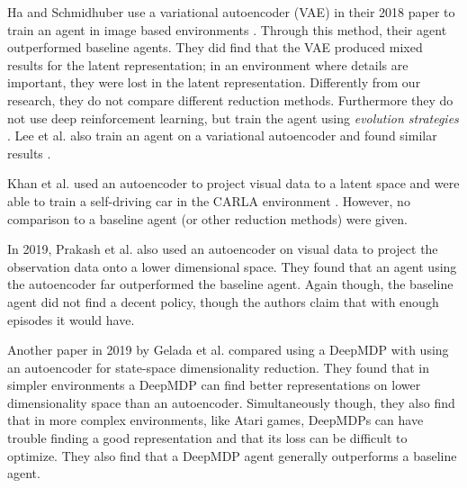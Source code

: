 Ha and Schmidhuber use a variational autoencoder (VAE) \cite{vae} in their 2018 paper to train an agent in image based environments \cite{rl_vae}. Through this method, their agent outperformed baseline agents. They did find that the VAE produced mixed results for the latent representation; in an environment where details are important, they were lost in the latent representation. Differently from our research, they do not compare different reduction methods. Furthermore they do not use deep reinforcement learning, but train the agent using \textit{evolution strategies} \cite{es}. Lee et al. also train an agent on a variational autoencoder and found similar results \cite{rl_vaetwo}.

Khan et al. used an autoencoder to project visual data to a latent space and were able to train a self-driving car in the CARLA environment \cite{rl_carla}\cite{carla}. However, no comparison to a baseline agent (or other reduction methods) were given.

In 2019, Prakash et al. \cite{AE_2019} also used an autoencoder on visual data to project the observation data onto a lower dimensional space. They found that an agent using the autoencoder far outperformed the baseline agent. Again though, the baseline agent did not find a decent policy, though the authors claim that with enough episodes it would have.

Another paper in 2019 by Gelada et al. \cite{deepmdp} compared using a DeepMDP with using an autoencoder for state-space dimensionality reduction. They found that in simpler environments a DeepMDP can find better representations on lower dimensionality space than an autoencoder. Simultaneously though, they also find that in more complex environments, like Atari games, DeepMDPs can have trouble finding a good representation and that its loss can be difficult to optimize. They also find that a DeepMDP agent generally outperforms a baseline agent. 



